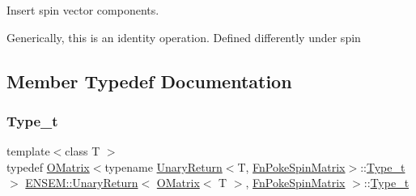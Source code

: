 Insert spin vector components. 

Generically, this is an identity operation. Defined differently under spin 

\subsection{Member Typedef Documentation}
\mbox{\label{structENSEM_1_1UnaryReturn_3_01OMatrix_3_01T_01_4_00_01FnPokeSpinMatrix_01_4_a2018c95323ea7832f6e1e071be4629b8}} 
\subsubsection{\texorpdfstring{Type\_t}{Type\_t}\hspace{0.1cm}{\footnotesize\ttfamily [1/2]}}
{\footnotesize\ttfamily template$<$class T $>$ \\
typedef \mbox{\hyperlink{classENSEM_1_1OMatrix}{O\+Matrix}}$<$typename \mbox{\hyperlink{structENSEM_1_1UnaryReturn}{Unary\+Return}}$<$T, \mbox{\hyperlink{structENSEM_1_1FnPokeSpinMatrix}{Fn\+Poke\+Spin\+Matrix}}$>$\+::\mbox{\hyperlink{structENSEM_1_1UnaryReturn_3_01OMatrix_3_01T_01_4_00_01FnPokeSpinMatrix_01_4_a2018c95323ea7832f6e1e071be4629b8}{Type\+\_\+t}}$>$ \mbox{\hyperlink{structENSEM_1_1UnaryReturn}{E\+N\+S\+E\+M\+::\+Unary\+Return}}$<$ \mbox{\hyperlink{classENSEM_1_1OMatrix}{O\+Matrix}}$<$ T $>$, \mbox{\hyperlink{structENSEM_1_1FnPokeSpinMatrix}{Fn\+Poke\+Spin\+Matrix}} $>$\+::\mbox{\hyperlink{structENSEM_1_1UnaryReturn_3_01OMatrix_3_01T_01_4_00_01FnPokeSpinMatrix_01_4_a2018c95323ea7832f6e1e071be4629b8}{Type\+\_\+t}}}

\mbox{\label{structENSEM_1_1UnaryReturn_3_01OMatrix_3_01T_01_4_00_01FnPokeSpinMatrix_01_4_a2018c95323ea7832f6e1e071be4629b8}} 
